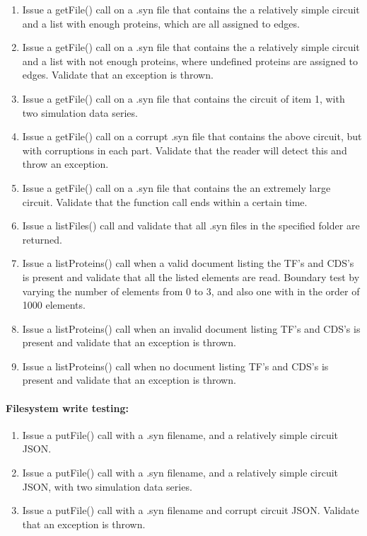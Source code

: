 \begin{enumerate}
\item Issue a getFile() call on a .syn file that contains the a relatively simple circuit  and a list with enough proteins, which are all assigned to edges.

\item Issue a getFile() call on a .syn file that contains the a relatively simple circuit  and a list with not enough proteins, where undefined proteins are assigned to edges. Validate that an exception is thrown.\item Issue a getFile() call on  a .syn file that contains the  circuit of item 1, with two simulation data series.
\item Issue a getFile() call on  a corrupt .syn file that contains the above circuit, but with corruptions in each part.
Validate that the reader will detect this and throw an exception.
\item Issue a getFile() call on  a .syn file that contains the an extremely large circuit. Validate that the function call ends within a certain time. 
\item Issue a listFiles() call and validate that all .syn files in the specified folder are returned.

\item Issue a listProteins() call when a valid document listing the TF's and CDS's is present and validate that all the listed elements are read.
 Boundary test by varying the number of elements from 0 to 3, and also one with in the order of 1000 elements.\item Issue a listProteins() call when an  invalid document listing TF's and CDS's is present and validate that an exception is thrown.
\item Issue a listProteins() call when no document listing TF's and CDS's is present and validate that an exception is thrown.\end{enumerate}

\paragraph{Filesystem write testing:}

\begin{enumerate}
\item Issue a putFile() call with a .syn filename, and a relatively simple circuit JSON.
\item  Issue a putFile() call with a .syn filename, and a  relatively simple circuit JSON, with two simulation data series.
\item  Issue a putFile() call with a .syn filename and corrupt circuit JSON. Validate that an exception is thrown. 
\end{enumerate}

